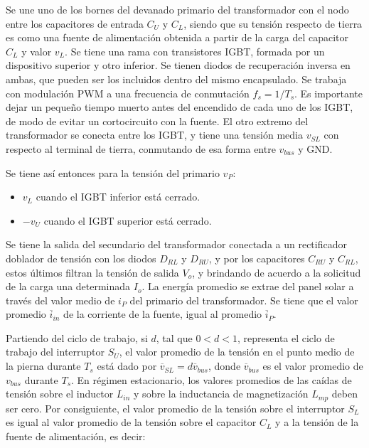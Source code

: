 Se une uno de los bornes del devanado primario del transformador con el nodo entre los capacitores de entrada $C_U$ y $C_L$, siendo que su tensión respecto de tierra es como una fuente de alimentación obtenida a partir de la carga del capacitor $C_L$ y valor $v_L$.  Se tiene una rama con transistores IGBT, formada por un dispositivo superior y otro inferior. Se tienen diodos de recuperación inversa en ambas, que pueden ser los incluidos dentro del mismo encapsulado. Se trabaja con modulación PWM a una frecuencia de conmutación $f_s=1/T_s$. Es importante dejar un pequeño tiempo muerto antes del encendido de cada uno de los IGBT, de modo de evitar un cortocircuito con la fuente. El otro extremo del transformador se conecta entre los IGBT, y tiene una tensión media $v_{SL}$ con respecto al terminal de tierra, conmutando de esa forma entre $v_{bus}$ y GND.

Se tiene así entonces para la tensión del primario $v_P$:

\begin{itemize}
	\item $v_L$ cuando el IGBT inferior está cerrado.
	\item $-v_U$ cuando el IGBT superior está cerrado.
\end{itemize}

Se tiene la salida del secundario del transformador conectada a un rectificador doblador de tensión con los diodos $D_{RL}$ y $D_{RU}$, y por los capacitores $C_{RU}$ y $C_{RL}$, estos últimos filtran la tensión de salida $V_o$, y brindando de acuerdo a la solicitud de la carga una determinada $I_o$. La energía promedio se extrae del panel solar a través del valor medio de $i_P$ del primario del transformador. Se tiene que el valor promedio $\overline{i}_{in}$ de la corriente de la fuente, igual al promedio $\overline{i}_P$.

Partiendo del ciclo de trabajo, si \( d \), tal que \( 0 < d < 1 \), representa el ciclo de trabajo del interruptor \( S_U \), el valor promedio de la tensión en el punto medio de la pierna durante \( T_s \) está dado por \(\overline{v}_{SL} = d\overline{v}_{bus}\), donde \(\overline{v}_{bus}\) es el valor promedio de \( v_{bus} \) durante \( T_s \). En régimen estacionario, los valores promedios de las caídas de tensión sobre el inductor \( L_{in} \) y sobre la inductancia de magnetización \( L_{mp} \) deben ser cero. Por consiguiente, el valor promedio de la tensión sobre el interruptor \( S_L \) es igual al valor promedio de la tensión sobre el capacitor \( C_L \) y a la tensión de la fuente de alimentación, es decir:

